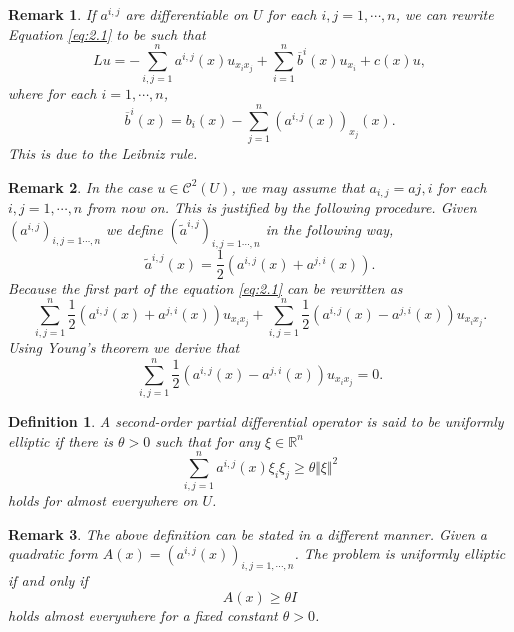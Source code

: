 \documentclass{article}
\newtheorem{definition}{Definition}[section]
\newtheorem{remark}{Remark}[section]
\numberwithin{equation}{section}
\begin{document}
\begin{remark}
If $a^{i,j}$ are differentiable on $U$ for each $i,j=1,\cdots,n$, we can rewrite Equation \ref{eq:2.1} to be such that
\begin{equation}
\label{eq:2.2}
Lu = -\sum_{i,j=1}^n a^{i,j}(x)u_{x_ix_j}+\sum_{i=1}^n\overline{b}^i(x)u_{x_i}+c(x)u,
\end{equation}
where for each $i=1,\cdots,n$,
\begin{equation*}
\overline{b}^i(x) = b_i(x)-\sum_{j=1}^n (a^{i,j}(x))_{x_j}(x).
\end{equation*}
This is due to the Leibniz rule.
\end{remark}

\begin{remark}
In the case $u\in\mathcal{C}^2(U)$, we may assume that $a_{i,j}=a{j,i}$ for each $i,j=1,\cdots,n$ from now on. This is justified by the following procedure.
Given $(a^{i,j})_{i,j=1\cdots,n}$ we define $(\tilde{a}^{i,j})_{i,j=1\cdots,n}$ in the following way,
\begin{equation*}
\tilde{a}^{i,j}(x) = {\frac 1 2}(a^{i,j}(x)+a^{j,i}(x)).
\end{equation*}
Because the first part of the equation \ref{eq:2.1} can be rewritten as
\begin{equation*}
\sum_{i,j=1}^n {\frac 1 2}(a^{i,j}(x)+a^{j,i}(x))u_{x_ix_j}+\sum_{i,j=1}^n{\frac 1 2}(a^{i,j}(x)-a^{j,i}(x))u_{x_ix_j}.
\end{equation*}
Using Young's theorem we derive that
\begin{equation*}
\sum_{i,j=1}^n{\frac 1 2}(a^{i,j}(x)-a^{j,i}(x))u_{x_ix_j} = 0.
\end{equation*}
\end{remark}

\begin{definition}
A second-order partial differential operator is said to be uniformly elliptic if there is $\theta>0$ such that for any $\xi\in\mathbb{R}^n$
\begin{equation*}
\sum_{i,j=1}^n a^{i,j}(x)\xi_i\xi_j \geq \theta\Vert \xi\Vert^2 
\end{equation*}
holds for almost everywhere on $U$.
\end{definition}

\begin{remark}
The above definition can be stated in a different manner. Given a quadratic form $A(x) = (a^{i,j}(x))_{i,j=1,\cdots,n}$. The problem is uniformly elliptic if and only if 
\begin{equation*}
A(x)\geq \theta I
\end{equation*}
holds almost everywhere for a fixed constant $\theta>0$.
\end{remark}
\end{document}
